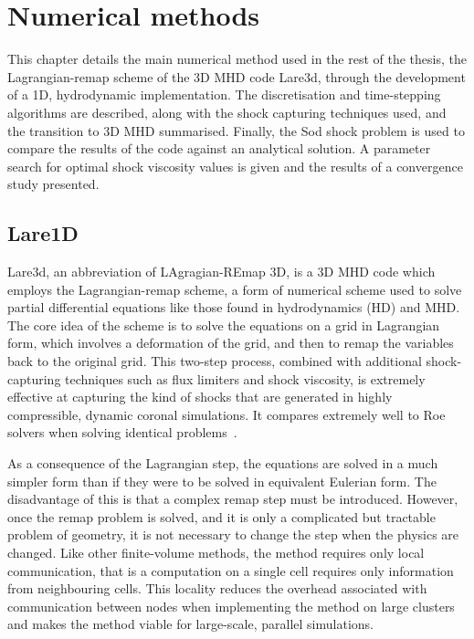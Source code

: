 \chapter{Numerical methods}

\label{chp:numerical_methods}

\graphicspath{{images/numerical_methods/}}

This chapter details the main numerical method used in the rest of the thesis, the Lagrangian-remap scheme of the 3D MHD code Lare3d, through the development of a 1D, hydrodynamic implementation. The discretisation and time-stepping algorithms are described, along with the shock capturing techniques used, and the transition to 3D MHD summarised. Finally, the Sod shock problem is used to compare the results of the code against an analytical solution. A parameter search for optimal shock viscosity values is given and the results of a convergence study presented.

\section{Lare1D}

Lare3d, an abbreviation of LAgragian-REmap 3D, is a 3D MHD code which employs the Lagrangian-remap scheme, a form of numerical scheme used to solve partial differential equations like those found in hydrodynamics (HD) and MHD. The core idea of the scheme is to solve the equations on a grid in Lagrangian form, which involves a deformation of the grid, and then to remap the variables back to the original grid. This two-step process, combined with additional shock-capturing techniques such as flux limiters and shock viscosity, is extremely effective at capturing the kind of shocks that are generated in highly compressible, dynamic coronal simulations. It compares extremely well to Roe solvers when solving identical problems~\cite{arberStaggeredGridLagrangian2001}.

As a consequence of the Lagrangian step, the equations are solved in a much simpler form than if they were to be solved in equivalent Eulerian form. The disadvantage of this is that a complex remap step must be introduced. However, once the remap problem is solved, and it is only a complicated but tractable problem of geometry, it is not necessary to change the step when the physics are changed. Like other finite-volume methods, the method requires only local communication, that is a computation on a single cell requires only information from neighbouring cells. This locality reduces the overhead associated with communication between nodes when implementing the method on large clusters and makes the method viable for large-scale, parallel simulations. 

